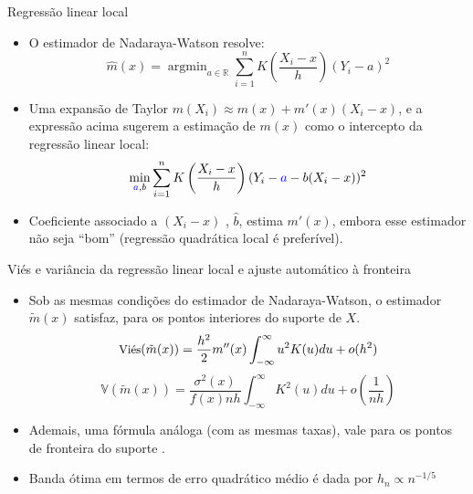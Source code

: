 \documentclass[11pt]{beamer}
\begin{document}
	\begin{frame}{Regressão linear local}
	\begin{itemize}
		\item O estimador de Nadaraya-Watson resolve:
	$$\hat{m}(x) = \operatorname{argmin}_{a \in \mathbb{R}} \sum_{i=1}^n K\left(\frac{X_i-x}{h}\right)(Y_i-a)^2$$
	\item Uma expansão de Taylor $m(X_i) \approx m(x) + m'(x)(X_i-x)$, e a expressão acima sugerem a estimação de $m(x)$ como o intercepto da {\color{blue}regressão linear local}:
	$$\min_{{\color{blue}a},b} \sum_{i=1}^n K\left(\frac{X_i-x}{h}\right)(Y_i-{\color{blue}a} - b(X_i-x))^2$$
	\item Coeficiente associado a $(X_i-x)$ , $\hat{b}$, estima $m'(x)$, embora esse estimador não seja ``bom'' (regressão quadrática local é preferível).
	
	\end{itemize}
\end{frame}
	
	\begin{frame}{Viés e variância da regressão linear local e ajuste automático à fronteira}
	\begin{itemize}
		\item Sob as mesmas condições do estimador de Nadaraya-Watson, o estimador $\tilde{m}(x)$ satisfaz, para os pontos interiores do suporte de $X$.
			$$\small \text{Vi\'{e}s}(\tilde{m}(x)) = \frac{h^{2}}{2} m^{\prime \prime}(x)  \int_{-\infty}^{\infty} u^{2} K(u) d u + o(h^2)$$
	$$\mathbb{V}(\tilde{m}(x)) = \frac{\sigma^{2}(x)}{f(x) n h} \int_{-\infty}^{\infty} K^{2}(u) d u + o\left(\frac{1}{nh}\right)$$
	\item Ademais, uma fórmula análoga (com as mesmas taxas), vale para os pontos de fronteira do suporte \citep[Teorema 3.3]{Fan1996}.
	\item Banda ótima em termos de erro quadrático médio é dada por $h_n \propto n^{-1/5}$ 
	\end{itemize}
	\end{frame}
	
\end{document}

